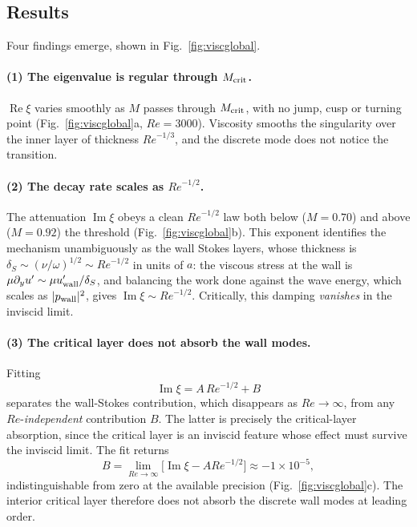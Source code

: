 \documentclass[11pt,a4paper]{article}
\newcommand{\Rey}{\mathit{Re}}
\theoremstyle{plain}
\theoremstyle{remark}
\begin{document}
\subsection{Results}
Four findings emerge, shown in Fig.~\ref{fig:viscglobal}.

\paragraph{(1) The eigenvalue is regular through $M_{\rm crit}$.} $\operatorname{Re}\xi$ varies
smoothly as $M$ passes through $M_{\rm crit}$, with no jump, cusp or turning point
(Fig.~\ref{fig:viscglobal}a, $\Rey=3000$). Viscosity smooths the singularity over the inner layer of
thickness $\Rey^{-1/3}$, and the discrete mode does not notice the transition.

\paragraph{(2) The decay rate scales as $\Rey^{-1/2}$.} The attenuation $\operatorname{Im}\xi$ obeys a
clean $\Rey^{-1/2}$ law both below ($M=0.70$) and above ($M=0.92$) the threshold
(Fig.~\ref{fig:viscglobal}b). This exponent identifies the mechanism unambiguously as the wall Stokes
layers, whose thickness is $\delta_S\sim(\nu/\omega)^{1/2}\sim \Rey^{-1/2}$ in units of $a$: the
viscous stress at the wall is $\mu\partial_yu'\sim\mu u'_{\rm wall}/\delta_S$, and balancing the work
done against the wave energy, which scales as $|p_{\rm wall}|^2$, gives $\operatorname{Im}\xi\sim
\Rey^{-1/2}$. Critically, this damping \emph{vanishes} in the inviscid limit.

\paragraph{(3) The critical layer does not absorb the wall modes.} Fitting
\begin{equation}
\operatorname{Im}\xi=A\,\Rey^{-1/2}+B
\end{equation}
separates the wall-Stokes contribution, which disappears as $\Rey\to\infty$, from any
$\Rey$-\emph{independent} contribution $B$. The latter is precisely the critical-layer absorption,
since the critical layer is an inviscid feature whose effect must survive the inviscid limit. The fit
returns
\begin{equation}
B=\lim_{\Rey\to\infty}\bigl[\operatorname{Im}\xi-A\Rey^{-1/2}\bigr]\approx-1\times10^{-5},
\end{equation}
indistinguishable from zero at the available precision (Fig.~\ref{fig:viscglobal}c). The interior
critical layer therefore does not absorb the discrete wall modes at leading order.
\end{document}
